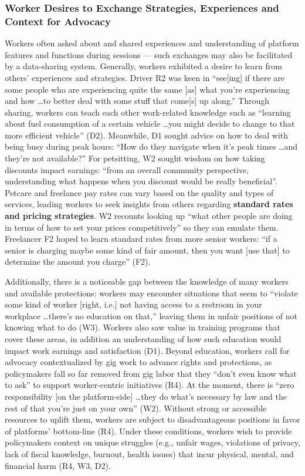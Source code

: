 \subsubsection{{Worker Desires to Exchange} Strategies, Experiences and Context for Advocacy}\label{h.pplzn44x8y2i}
Workers often asked about and shared experiences and understanding of platform features and functions during sessions --- such exchanges may also be facilitated by a data-sharing system. 
Generally, workers exhibited a desire to learn from others' experiences and strategies. Driver R2 was keen in ``see[ing] if there are some people who are experiencing quite the same [as] what you're experiencing and how  \dots  to better deal with some stuff that come[s] up along.'' Through sharing, workers can teach each other work-related knowledge such as ``learning about fuel consumption of a certain vehicle \dots you might decide to change to that more efficient vehicle'' (D2). Meanwhile, D1 sought advice on how to deal with being busy during peak hours: ``How do they navigate when it's peak times  \dots  and they're not available?'' For petsitting, W2 sought wisdom on how taking discounts impact earnings: ``from an overall community perspective, understanding what happens when you discount would be really beneficial''. Petcare and freelance pay rates can vary based on the quality and types of services, leading workers to seek insights from others regarding \textbf{standard rates and pricing strategies}. W2 recounts looking up ``what other people are doing in terms of how to set your prices competitively'' so they can emulate them. Freelancer F2 hoped to learn standard rates from more senior workers: ``if a senior is charging maybe some kind of fair amount, then you want [use that] to determine the amount you charge'' (F2).  

Additionally, there is a noticeable gap between the knowledge of many workers and available protections: workers may encounter situations that seem to ``violate some kind of worker [right, i.e.] not having access to a restroom in your workplace \dots there's no education on that,'' leaving them in unfair positions of not knowing what to do (W3).
Workers {also saw value in} training programs {that cover} these areas{, in addition an understanding of how such education would impact work earnings and satisfaction} (D1).
Beyond education, workers call for advocacy contextualized by gig work to advance rights and protections, as policymakers fall so far removed from gig labor that they ``don't even know what to ask'' to support worker-centric initiatives (R4). At the moment, there is ``zero responsibility [on the platform-side] \dots they do what's necessary by law and the rest of that you're just on your own'' (W2). Without strong or accessible resources to uplift them, workers are subject to disadvantageous positions in favor of platforms' bottom-line (R4). Under these conditions, workers wish to provide policymakers context on unique struggles (e.g., unfair wages, violations of privacy, lack of fiscal knowledge, burnout, health issues) that incur physical, mental, and financial harm (R4, W3, D2). 


